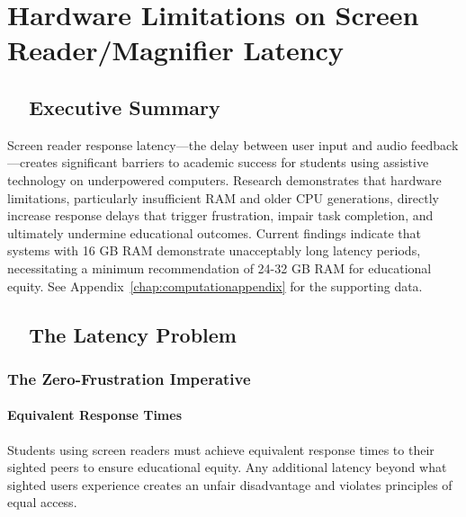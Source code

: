 \chapter{Hardware Limitations on Screen Reader/Magnifier Latency}\label{vision-assistive-technology-laptop-computer-requirements}
\raggedright
\section{~~Executive Summary}\label{executive-summary}

Screen reader response latency—the delay between user input and audio feedback—creates significant barriers to academic success for students using assistive technology on underpowered computers.\supercite{Foley2017AssistiveTechnologyOutcomes} Research demonstrates that hardware limitations, particularly insufficient RAM and older CPU generations, directly increase response delays that trigger frustration, impair task completion, and ultimately undermine educational outcomes.\supercite{Kelly2011, StudentOutcomesResearch} Current findings indicate that systems with 16 GB RAM demonstrate unacceptably long latency periods, necessitating a minimum recommendation of 24-32 GB RAM for educational equity. See Appendix~\ref{chap:computationappendix} for the supporting data.

\section{~~The Latency Problem}\label{the-latency-problem}

\subsection{The Zero-Frustration Imperative}\label{the-zero-frustration-imperative}

\subsubsection{Equivalent Response Times}

Students using screen readers must achieve equivalent response times to their sighted peers to ensure educational equity. Any additional latency beyond what sighted users experience creates an unfair disadvantage and violates principles of equal access.\supercite{ADA1990, Section508}

